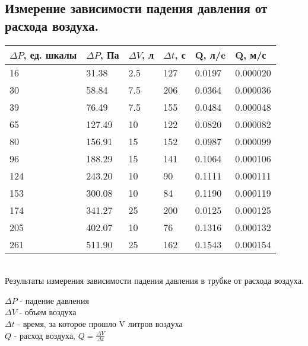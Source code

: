 \documentclass{article}
\begin{document}
    \subsection{Измерение зависимости падения давления от расхода воздуха.}
    \begin{center}
        \begin{tabular}{ | l | l | l | l | l | l |}
            \hline
            $\Delta P$, ед. шкалы & $\Delta P$, Па & $\Delta V$, л  & $\Delta t$, с &  Q, л/c & Q, м/с \\ \hline
            16  & 31.38  & 2.5 & 127 & 0.0197 & 0.000020 \\
            30  & 58.84  & 7.5 & 206 & 0.0364 & 0.000036 \\
            39  & 76.49  & 7.5 & 155 & 0.0484 & 0.000048 \\
            65  & 127.49 & 10  & 122 & 0.0820 & 0.000082 \\
            80  & 156.91 & 15  & 152 & 0.0987 & 0.000099 \\
            96  & 188.29 & 15  & 141 & 0.1064 & 0.000106 \\
            124 & 243.20 & 10  & 90  & 0.1111 & 0.000111 \\
            153 & 300.08 & 10  & 84  & 0.1190 & 0.000119 \\
            174 & 341.27 & 25  & 200 & 0.0125 & 0.000125 \\
            205 & 402.07 & 10  & 76  & 0.1316 & 0.000132 \\
            261 & 511.90 & 25  & 162 & 0.1543 & 0.000154 \\
            \hline
        \end{tabular}\\
        Результаты измерения зависимости падения давления в трубке от расхода воздуха.
    \end{center}
    $\Delta P$ - падение давления\\
    $\Delta V$ - объем воздуха\\
    $\Delta t$ - время, за которое прошло V литров воздуха\\
    $Q$ - расход воздуха, $Q=\frac{\Delta V}{\Delta t}$
\end{document}
